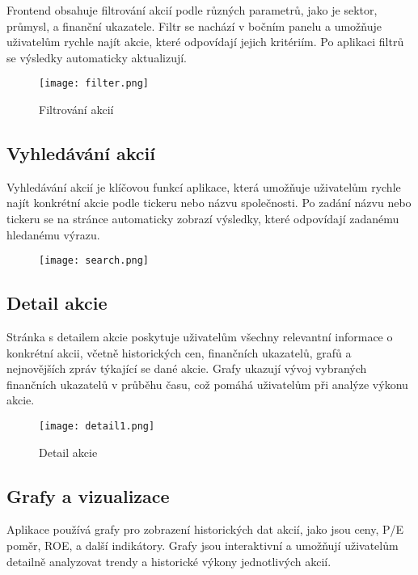 \documentclass[12pt, a4paper]{report}
\begin{document}
Frontend obsahuje filtrování akcií podle různých parametrů, jako je sektor, průmysl, a finanční ukazatele. Filtr se nachází v bočním panelu a umožňuje uživatelům rychle najít akcie, které odpovídají jejich kritériím. Po aplikaci filtrů se výsledky automaticky aktualizují.

\begin{figure}[h]
	\centering
	\texttt{[image: filter.png]}
    \caption{Filtrování akcií}
\end{figure}

\subsection{Vyhledávání akcií}

Vyhledávání akcií je klíčovou funkcí aplikace, která umožňuje uživatelům rychle najít konkrétní akcie podle tickeru nebo názvu společnosti. Po zadání názvu nebo tickeru se na stránce automaticky zobrazí výsledky, které odpovídají zadanému hledanému výrazu.

\begin{figure}[h]
	\centering
	\texttt{[image: search.png]}
\end{figure}

\subsection{Detail akcie}

Stránka s detailem akcie poskytuje uživatelům všechny relevantní informace o konkrétní akcii, včetně historických cen, finančních ukazatelů, grafů a nejnovějších zpráv týkající se dané akcie. Grafy ukazují vývoj vybraných finančních ukazatelů v průběhu času, což pomáhá uživatelům při analýze výkonu akcie.

\begin{figure}[h]
	\centering
	\texttt{[image: detail1.png]}
    \caption{Detail akcie}
\end{figure}

\subsection{Grafy a vizualizace}

Aplikace používá grafy pro zobrazení historických dat akcií, jako jsou ceny, P/E poměr, ROE, a další indikátory. Grafy jsou interaktivní a umožňují uživatelům detailně analyzovat trendy a historické výkony jednotlivých akcií.
\end{document}
